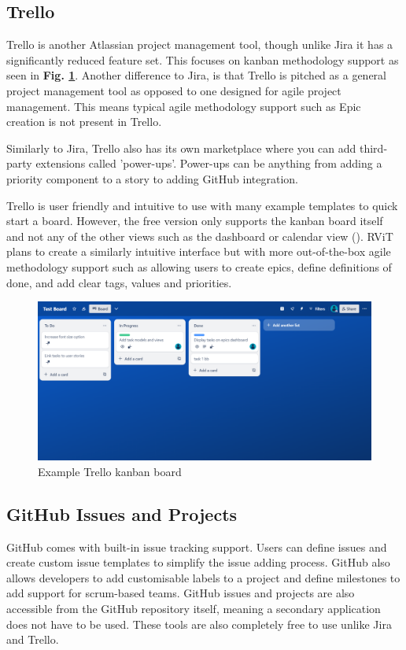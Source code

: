 \documentclass[l4proj.tex]{subfiles}
\begin{document}
\subsection{Trello}
Trello is another Atlassian project management tool, though unlike Jira it has a significantly reduced feature set. This focuses on kanban methodology support as seen in \textbf{Fig. \ref{fig:Trello kanban}}. Another difference to Jira, is that Trello is pitched as a general project management tool as opposed to one designed for agile project management. This means typical agile methodology support such as Epic creation is not present in Trello.

Similarly to Jira, Trello also has its own marketplace where you can add third-party extensions called 'power-ups'. Power-ups can be anything from adding a priority component to a story to adding GitHub integration.

Trello is user friendly and intuitive to use with many example templates to quick start a board. However, the free version only supports the kanban board itself and not any of the other views such as the dashboard or calendar view (\cite{TrelloPricing}). RViT plans to create a similarly intuitive interface but with more out-of-the-box agile methodology support such as allowing users to create epics, define definitions of done, and add clear tags, values and priorities.


\begin{figure}[h!]
\begin{center}
\includegraphics[scale=0.32]{dissertation/images/TrelloKanbanBoard.png}
\caption{Example Trello kanban board}
\label{fig:Trello kanban} 
\end{center}
\end{figure}

\subsection{GitHub Issues and Projects}
GitHub comes with built-in issue tracking support. Users can define issues and create custom issue templates to simplify the issue adding process. GitHub also allows developers to add customisable labels to a project and define milestones to add support for scrum-based teams. GitHub issues and projects are also accessible from the GitHub repository itself, meaning a secondary application does not have to be used. These tools are also completely free to use unlike Jira and Trello.
\end{document}
